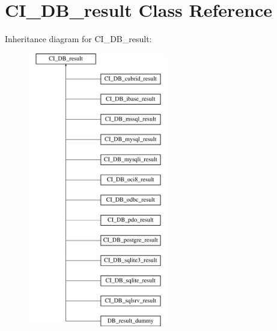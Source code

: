\hypertarget{class_c_i___d_b__result}{}\section{C\+I\+\_\+\+D\+B\+\_\+result Class Reference}
\label{class_c_i___d_b__result}
Inheritance diagram for C\+I\+\_\+\+D\+B\+\_\+result\+:\begin{figure}[H]
\begin{center}
\leavevmode
\includegraphics[height=12.000000cm]{class_c_i___d_b__result}
\end{center}
\end{figure}
